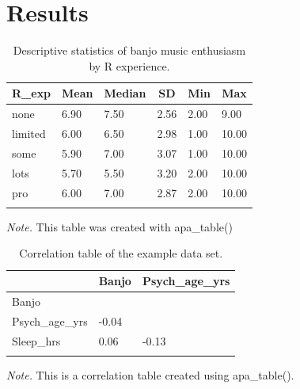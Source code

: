 \documentclass[english,man]{apa6}
\theoremstyle{definition}
\theoremstyle{definition}
\theoremstyle{definition}
\theoremstyle{remark}
\begin{document}
\section{Results}\label{results}

\begin{table}[tbp]
\begin{center}
\begin{threeparttable}
\caption{\label{tab:Banjo-by-experience}Descriptive statistics of banjo music enthusiasm by R experience.}
\begin{tabular}{llllll}
\toprule
R\_exp & \multicolumn{1}{c}{Mean} & \multicolumn{1}{c}{Median} & \multicolumn{1}{c}{SD} & \multicolumn{1}{c}{Min} & \multicolumn{1}{c}{Max}\\
\midrule
none & 6.90 & 7.50 & 2.56 & 2.00 & 9.00\\
limited & 6.00 & 6.50 & 2.98 & 1.00 & 10.00\\
some & 5.90 & 7.00 & 3.07 & 1.00 & 10.00\\
lots & 5.70 & 5.50 & 3.20 & 2.00 & 10.00\\
pro & 6.00 & 7.00 & 2.87 & 2.00 & 10.00\\
\bottomrule
\addlinespace
\end{tabular}
\begin{tablenotes}[para]
\textit{Note.} This table was created with apa\_table()
\end{tablenotes}
\end{threeparttable}
\end{center}
\end{table}

\begin{table}[tbp]
\begin{center}
\begin{threeparttable}
\caption{\label{tab:apa-corr-table}Correlation table of the example data set.}
\begin{tabular}{lll}
\toprule
 & \multicolumn{1}{c}{Banjo} & \multicolumn{1}{c}{Psych\_age\_yrs}\\
\midrule
Banjo &  & \\
Psych\_age\_yrs & -0.04 & \\
Sleep\_hrs & 0.06 & -0.13\\
\bottomrule
\addlinespace
\end{tabular}
\begin{tablenotes}[para]
\textit{Note.} This is a correlation table created using apa\_table().
\end{tablenotes}
\end{threeparttable}
\end{center}
\end{table}
\end{document}
